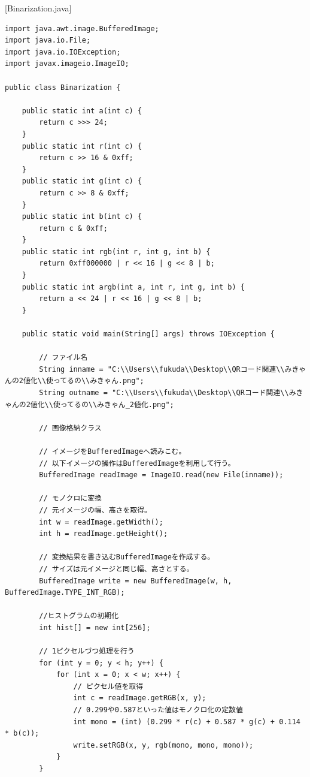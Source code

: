 \documentclass{thesis}
\begin{document}
[Binarization.java]
\begin{lstlisting}
import java.awt.image.BufferedImage;
import java.io.File;
import java.io.IOException;
import javax.imageio.ImageIO;

public class Binarization {

	public static int a(int c) {
		return c >>> 24;
	}
	public static int r(int c) {
		return c >> 16 & 0xff;
	}
	public static int g(int c) {
		return c >> 8 & 0xff;
	}
	public static int b(int c) {
		return c & 0xff;
	}
	public static int rgb(int r, int g, int b) {
		return 0xff000000 | r << 16 | g << 8 | b;
	}
	public static int argb(int a, int r, int g, int b) {
		return a << 24 | r << 16 | g << 8 | b;
	}

	public static void main(String[] args) throws IOException {

		// ファイル名
		String inname = "C:\\Users\\fukuda\\Desktop\\QRコード関連\\みきゃんの2値化\\使ってるの\\みきゃん.png";
		String outname = "C:\\Users\\fukuda\\Desktop\\QRコード関連\\みきゃんの2値化\\使ってるの\\みきゃん_2値化.png";

		// 画像格納クラス

		// イメージをBufferedImageへ読みこむ。
		// 以下イメージの操作はBufferedImageを利用して行う。
		BufferedImage readImage = ImageIO.read(new File(inname));

		// モノクロに変換
		// 元イメージの幅、高さを取得。
		int w = readImage.getWidth();
		int h = readImage.getHeight();

		// 変換結果を書き込むBufferedImageを作成する。
		// サイズは元イメージと同じ幅、高さとする。
		BufferedImage write = new BufferedImage(w, h, BufferedImage.TYPE_INT_RGB);

		//ヒストグラムの初期化
		int hist[] = new int[256];

		// 1ピクセルづつ処理を行う
		for (int y = 0; y < h; y++) {
			for (int x = 0; x < w; x++) {
				// ピクセル値を取得
				int c = readImage.getRGB(x, y);
				// 0.299や0.587といった値はモノクロ化の定数値
				int mono = (int) (0.299 * r(c) + 0.587 * g(c) + 0.114 * b(c));
				write.setRGB(x, y, rgb(mono, mono, mono));
			}
		}


\end{lstlisting}
\end{document}
